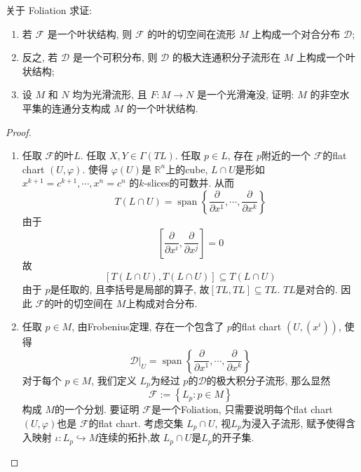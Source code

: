 \documentclass[../main.tex]{subfiles}
\begin{document}
\begin{exercise}{}{}
关于 Foliation 求证:
\begin{enumerate}
\item 若 $\mathcal{F}$ 是一个叶状结构, 则 $\mathcal{F}$ 的叶的切空间在流形 $M$ 上构成一个对合分布 $\mathcal{D}$;
\item 反之, 若 $\mathcal{D}$ 是一个可积分布, 则 $\mathcal{D}$ 的极大连通积分子流形在 $M$ 上构成一个叶状结构;
\item 设 $M$ 和 $N$ 均为光滑流形, 且 $F: M \to N$ 是一个光滑淹没, 证明: $M$ 的非空水平集的连通分支构成 $M$ 的一个叶状结构.
\end{enumerate}
\end{exercise}
\begin{proof}
    \begin{enumerate}
        \item 任取 \(  \mathcal{F}  \)的叶\(  L  \). 任取 \(  X,Y \in  \Gamma \left( TL \right)   \). 任取 \(  p\in L  \), 存在 \(  p  \)附近的一个 \(  \mathcal{F}  \)的flat chart \(  \left( U, \varphi  \right)   \).  使得 \(   \varphi \left( U \right)   \)是 \(  \mathbb{R} ^{n}  \)上的cube,    \(  L\cap U  \)是形如  \(  x^{k+ 1}= c^{k+ 1},\cdots ,x^{n}= c^{n}  \) 的\(  k  \)-slices的可数并. 从而  \[
     T\left( L\cap U \right)= \operatorname{span}\left\{ \frac{\partial }{\partial x^{1}},\cdots ,\frac{\partial }{\partial x^{k}} \right\} 
        \]由于 \[
        [\frac{\partial }{\partial x^{i}},\frac{\partial }{\partial x^{j}}]= 0
        \]故 \[
        [T\left( L\cap U \right) ,T\left( L\cap U \right) ]\subseteq T\left( L\cap U \right) 
        \]由于 \(  p  \)是任取的, 且李括号是局部的算子, 故\(  [TL,TL]\subseteq TL  \). \(  TL  \)是对合的. 因此 \(  \mathcal{F}  \)的叶的切空间在 \(  M  \)上构成对合分布.
        \item   任取 \(  p \in M  \), 由Frobenius定理, 存在一个包含了 \(  p  \)的flat chart \(  \left( U, \left( x^{i} \right)  \right)   \), 使得
        \[
        \mathcal{D}|_{U}= \operatorname{span}\left\{ \frac{\partial }{\partial x^{1}},\cdots ,\frac{\partial }{\partial x^{k}} \right\}
        \]对于每个 \(  p\in M  \), 我们定义 \(  L_{p}  \)为经过 \(  p  \)的\(  \mathcal{D}  \)的极大积分子流形, 那么显然 
        \[
       \mathcal{F}:=  \left\{ L_{p} :p\in M\right\}
        \]构成 \(  M  \)的一个分划.       要证明 \(  \mathcal{F}  \)是一个Foliation, 只需要说明每个flat chart \(  \left( U, \varphi  \right)   \)也是 \(  \mathcal{F}  \)的flat chart.   考虑交集 \(  L_{p}\cap U  \), 视\(  L_{p}  \)为浸入子流形, 赋予使得含入映射 \(  \iota : L_{p}\hookrightarrow M  \)连续的拓扑,故 \(  L_{p}\cap U  \)是\(  L_{p}  \)的开子集.

\end{enumerate}
\end{proof}
\end{document}
